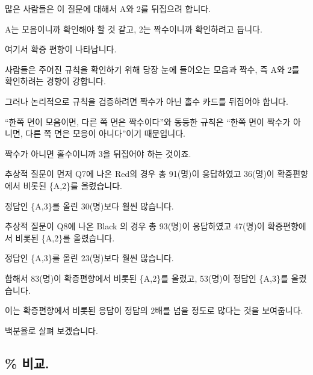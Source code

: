 \documentclass[
]{book}
\begin{document}
많은 사람들은 이 질문에 대해서 A와 2를 뒤집으려 합니다.

A는 모음이니까 확인해야 할 것 같고, 2는 짝수이니까 확인하려고 듭니다.

여기서 확증 편향이 나타납니다.

사람들은 주어진 규칙을 확인하기 위해 당장 눈에 들어오는 모음과 짝수, 즉 A와 2를 확인하려는 경향이 강합니다.

그러나 논리적으로 규칙을 검증하려면 짝수가 아닌 홀수 카드를 뒤집어야 합니다.

``한쪽 면이 모음이면, 다른 쪽 면은 짝수이다''와 동등한 규칙은 ``한쪽 면이 짝수가 아니면, 다른 쪽 면은 모응이 아니다''이기 때문입니다.

짝수가 아니면 홀수이니까 3을 뒤집어야 하는 것이죠.

추상적 질문이 먼저 Q7에 나온 Red의 경우 총 91(명)이 응답하였고 36(명)이 확증편향에서 비롯된 \{A,2\}를 올렸습니다.

정답인 \{A,3\}를 올린 30(명)보다 훨씬 많습니다.

추상적 질문이 Q8에 나온 Black 의 경우 총 93(명)이 응답하였고 47(명)이 확증편향에서 비롯된 \{A,2\}를 올렸습니다.

정답인 \{A,3\}를 올린 23(명)보다 훨씬 많습니다.

합해서 83(명)이 확증편향에서 비롯된 \{A,2\}를 올렸고, 53(명)이 정답인 \{A,3\}를 올렸습니다.

이는 확증편향에서 비롯된 응답이 정답의 2배를 넘을 정도로 많다는 것을 보여줍니다.

백분율로 살펴 보겠습니다.

\subsection{\% 비교.}\label{uxbe44uxad50.-4}
\end{document}
